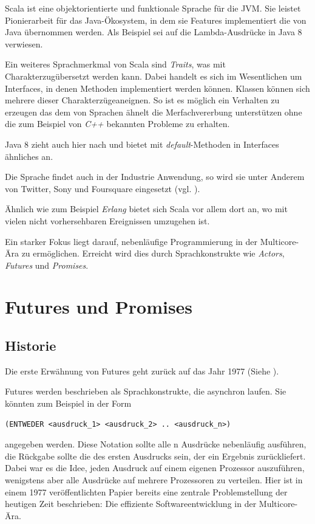 \documentclass[11pt,a4paper,titlepage,ngerman]{scrartcl}
\begin{document}
Scala ist eine objektorientierte und funktionale Sprache für die JVM. Sie
leistet Pionierarbeit für das Java-Ökosystem, in dem sie Features implementiert
die von Java übernommen werden. Als Beispiel sei auf die Lambda-Ausdrücke in
Java 8 verwiesen.

Ein weiteres Sprachmerkmal von Scala sind \emph{Traits}, was mit 
\glqq Charakterzug\grqq übersetzt werden kann. Dabei handelt es sich im
Wesentlichen um Interfaces, in denen Methoden implementiert werden können.
Klassen können sich mehrere dieser \glqq Charakterzüge\grqq aneignen.
So ist es möglich ein Verhalten zu erzeugen das dem von Sprachen ähnelt die
Merfachvererbung unterstützen ohne die zum Beispiel von \emph{C++} bekannten
Probleme zu erhalten.

Java 8 zieht auch hier nach und bietet mit \emph{default}-Methoden in Interfaces
ähnliches an.

Die Sprache findet auch in der Industrie Anwendung, so wird sie unter Anderem von Twitter,
Sony und Foursquare eingesetzt (vgl. \cite{scalaInEnterprise}).

Ähnlich wie zum Beispiel \emph{Erlang} bietet sich Scala vor allem dort an,
wo mit vielen nicht vorhersehbaren Ereignissen umzugehen ist.

Ein starker Fokus liegt darauf, nebenläufige Programmierung in der Multicore-Ära
zu ermöglichen. Erreicht wird dies durch Sprachkonstrukte wie \emph{Actors},
\emph{Futures} und \emph{Promises}.


\section{Futures und Promises}

\subsection{Historie}

Die erste Erwähnung von Futures geht zurück auf das Jahr 1977 
(Siehe \cite{Baker:1977:IGC:872734.806932}).

Futures werden beschrieben als Sprachkonstrukte, die asynchron laufen. Sie 
könnten zum Beispiel in der Form 
\begin{lstlisting}
(ENTWEDER <ausdruck_1> <ausdruck_2> .. <ausdruck_n>)
\end{lstlisting}
angegeben werden. Diese Notation sollte alle n Ausdrücke nebenläufig ausführen, 
die Rückgabe sollte die des ersten Ausdrucks sein, der ein Ergebnis zurückliefert.
Dabei war es die Idee, jeden Ausdruck auf einem eigenen Prozessor auszuführen, 
wenigstens aber alle Ausdrücke auf mehrere Prozessoren zu verteilen. Hier ist in 
einem 1977 veröffentlichten Papier bereits eine zentrale Problemstellung der 
heutigen Zeit beschrieben: Die effiziente Softwareentwicklung in der Multicore-Ära.
\end{document}
